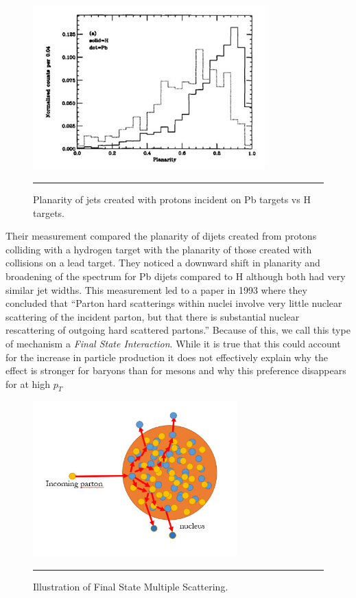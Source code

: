 \begin{figure}[htbp!]
  \centering
    \includegraphics[width=0.8\textwidth]{prevplots/e609planarity.jpg}
    \rule{35em}{0.5pt}
  \caption[Planarity of jets created with protons incident on Pb targets vs H targets.]{Planarity of jets created with protons incident on Pb targets vs H targets.}
  \label{fig:e609planarity}
\end{figure}
Their measurement compared the planarity of dijets created from protons colliding with a hydrogen target with the planarity of those created with collisions on a lead target. They noticed a downward shift in planarity and broadening of the spectrum for Pb dijets compared to H although both had very similar jet widths. This measurement led to a paper in 1993 where they concluded that “Parton hard scatterings within nuclei involve very little nuclear scattering of the incident parton, but that there is substantial nuclear rescattering of outgoing hard scattered partons.\citep{PhysRevLett.70.143}” Because of this, we call this type of mechanism a \textit{Final State Interaction}. While it is true that this could account for the increase in particle production it does not effectively explain why the effect is stronger for baryons than for mesons and why this preference disappears for at high $p_{T}$
\begin{figure}[htbp!]
  \centering
    \includegraphics[width=0.7\textwidth]{Figures/FSIscattering.jpg}
    \rule{35em}{0.5pt}
  \caption[Illustration of Final State Multiple Scattering]{Illustration of Final State Multiple Scattering.}
  \label{fig:FSIscattering}
\end{figure} 

